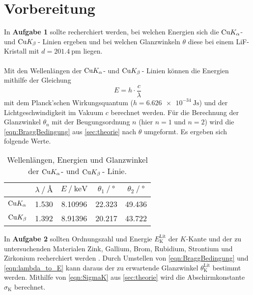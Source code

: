 \section{Vorbereitung}
\label{sec:vorbereitung}

    In \textbf{Aufgabe 1} sollte recherchiert werden,
    bei welchen Energien sich die $\ce{Cu} K_\alpha$- und $\ce{Cu} K_\beta \,$- Linien ergeben
    und bei welchen Glanzwinkeln $\theta$ diese bei einem LiF-Kristall mit $d = \SI{201.4}{\pico\meter}$ liegen.\\
    \\
    Mit den Wellenlängen der $\ce{Cu} K_\alpha$- und $\ce{Cu} K_\beta \,$- Linien können die Energien mithilfe der Gleichung
    \begin{equation}
        \label{eqn:lambda_to_E}
        E = h \cdot \frac{c}{\lambda}
    \end{equation}
    mit dem Planck'schen Wirkungsquantum ($h = \SI{6.626e-34}{\joule\second}$) und der Lichtgeschwindigkeit im Vakuum $c$ berechnet werden.
    Für die Berechnung der Glanzwinkel $\theta_n$
    mit der Beugungsordnung $n$ (hier $n=1$ und $n=2$)
    wird die \autoref{eqn:BraggBedingung} aus \autoref{sec:theorie} nach $\theta$ umgeformt.
    Es ergeben sich folgende Werte.

    \begin{table}
        \centering
        \caption{Wellenlängen, Energien und Glanzwinkel der $\ce{Cu} K_\alpha$- und $\ce{Cu} K_\beta \,$- Linie.}
        \label{tab:Vorbereitung1}
        \begin{tabular}{c S[table-format=1.3] S[table-format=1.5] S[table-format=2.3] S[table-format=2.3]}
            \toprule
            &
            {$\lambda \mathbin{/} \si{\angstrom}$} &
            {$E \mathbin{/} \si{\kilo\electronvolt}$} &
            {$\theta_1 \mathbin{/} \si{\degree}$} &
            {$\theta_2 \mathbin{/} \si{\degree}$} \\
            \midrule
            $\ce{Cu} K_\alpha$ & 1.530 & 8.10996 & 22.323 & 49.436 \\
            $\ce{Cu} K_\beta$  & 1.392 & 8.91396 & 20.217 & 43.722 \\
            \bottomrule
        \end{tabular}
    \end{table}


    In \textbf{Aufgabe 2} sollten Ordnungszahl und
    Energie $E^\text{Lit}_\text{K}$ der $K$-Kante und
    der zu untersuchenden Materialen Zink, Gallium, Brom, Rubidium, Strontium und Zirkonium
    recherchiert werden \cite{science_and_fun}.
    Durch Umstellen von \autoref{eqn:BraggBedingung} und \autoref{eqn:lambda_to_E}
    kann daraus der zu erwartende Glanzwinkel $\theta^\text{Lit}_\text{K}$ bestimmt werden.
    Mithilfe von \autoref{eqn:SigmaK} aus \autoref{sec:theorie} wird die Abschirmkonstante $\sigma_\text{K}$ berechnet.

